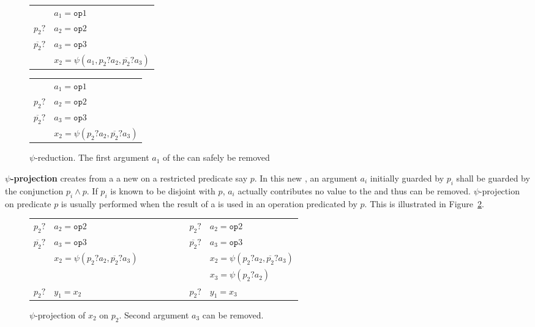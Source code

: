 \begin{figure}[h]
\begin{center}
\footnotesize
\hfill
\begin{tabular}{ll}
             & ${a_1 = \texttt{op}1}$  \\
${p_2?}$ & ${a_2 = \texttt{op}2}$        \\
${\overline{p_2}?}$ & ${a_3 = \texttt{op}3}$ \\
             & ${x_2 = \psi(a_1, p_2?a_2, \overline{p_2}?a_3)}$\\
\end{tabular}\hfill
\begin{tabular}{ll}
      & ${a_1 = \texttt{op}1}$ \\
 ${p_2?}$ & ${a_2 = \texttt{op}2}$ \\
 ${\overline{p_2}?}$ & ${a_3 = \texttt{op}3}$ \\
        &${x_2 = \psi(p_2?a_2, \overline{p_2}?a_3)}$ \\
\end{tabular}
\caption{$\psi$-reduction. The first argument  $a_1$ of the \psifun can safely be removed}
\label{fig:psi_reduction}
\end{center}
\end{figure}

\textbf{$\psi$-projection} creates from a \psifun a
  new \psifun on a restricted predicate say $p$.  In this new \psifun, an argument ${a_i}$ initially guarded by $p_i$ shall be guarded by the conjunction $p_i\wedge p$. If $p_i$ is known to be disjoint with $p$, $a_i$ actually
  contributes no value to the \psifun and thus can be
  removed. $\psi$-projection on predicate $p$ is usually performed when the result of a \psifun is used in an operation predicated by $p$. This is illustrated in Figure~\ref{fig:psi_projection}.

\begin{figure}[h]
\footnotesize
\hfill
\begin{tabular}{llp{3cm}ll}
${p_2?}$ & ${a_2 = \texttt{op}2}$             & \ \ \ \ \ \ \ \  & ${p_2?}$ & ${a_2 = \texttt{op}2}$ \\
${\overline{p_2}?}$ & ${a_3 = \texttt{op}3}$              & \ \ \ \  & ${\overline{p_2}?}$ & ${a_3 = \texttt{op}3}$ \\
             & ${x_2 = \psi(p_2?a_2, \overline{p_2}?a_3)}$ & \ \ \ \  &              &${x_2 = \psi(p_2?a_2, \overline{p_2}?a_3)}$ \\
             &                               & \ \ \ \  &              & ${x_3 = \psi(p_2?a_2)}$ \\
${p_2?}$ & ${y_1 = x_2}$              & \ \ \ \  & ${p_2?}$ & ${y_1 = x_3}$ \\
\end{tabular}
\caption{$\psi$-projection of $x_2$ on $p_2$. Second argument $a_3$ can be removed.}
\label{fig:psi_projection}
\end{figure}


